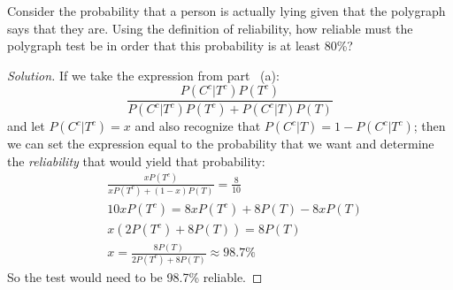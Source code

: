 \documentclass{article}
\begin{document}
		\item Consider the probability that a person is actually lying given that the polygraph
says that they are. Using the definition of reliability, how reliable
must the polygraph test be in order that this probability is at least 80\%?
\begin{proof}[Solution]
If we take the expression from part ~(a):
$$\frac{P(C^c|T^c)P(T^c)}{P(C^c|T^c)P(T^c)+P(C^c|T)P(T)}$$
and let $P(C^c|T^c) = x$ and also recognize that $P(C^c|T) = 1 - P(C^c|T^c)$; then we can set the expression equal to the probability that we want and determine the \textit{reliability} that would yield that probability:
\begin{align*}
&\frac{xP(T^c)}{xP(T^c)+(1-x)P(T)} = \frac{8}{10}\\
&10xP(T^c) = 8xP(T^c) + 8P(T) - 8xP(T) \\
&x(2P(T^c) + 8P(T)) = 8P(T)\\
&x = \frac{8P(T)}{2P(T^c) + 8P(T)} \approx 98.7\%
\end{align*}
So the test would need to be 98.7\% reliable.
\end{proof}
		
\end{document}
